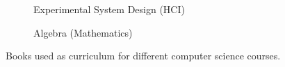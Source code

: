 \begin{figure}
  \centering
  \begin{subfigure}{0.48\textwidth}
    \centering
    \todo
    \caption{Experimental System Design (HCI)}
    \label{fig:meta_books_hci}
  \end{subfigure}
  \hspace{0.1em}
  \begin{subfigure}{0.48\textwidth}
    \centering
    \todo
    \caption{Algebra (Mathematics)}
    \label{fig:meta_books_math}
  \end{subfigure}
  \caption[]{Books used as curriculum for different computer science courses.}
  \label{fig:meta_books}
\end{figure}
